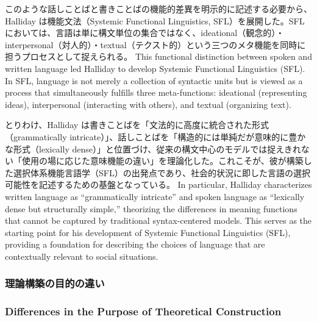 \ifJPN
このような話しことばと書きことばの機能的差異を明示的に記述する必要から、Halliday は機能文法（Systemic Functional Linguistics, SFL）を展開した。SFL においては、言語は単に構文単位の集合ではなく、ideational（観念的）・interpersonal（対人的）・textual（テクスト的）という三つのメタ機能を同時に担うプロセスとして捉えられる。
\else
  This functional distinction between spoken and written language led Halliday to develop Systemic Functional Linguistics (SFL). In SFL, language is not merely a collection of syntactic units but is viewed as a process that simultaneously fulfills three meta-functions: ideational (representing ideas), interpersonal (interacting with others), and textual (organizing text).
\fi

\ifJPN
とりわけ、Halliday は書きことばを「文法的に高度に統合された形式（grammatically intricate）」、話しことばを「構造的には単純だが意味的に豊かな形式（lexically dense）」と位置づけ、従来の構文中心のモデルでは捉えきれない「使用の場に応じた意味機能の違い」を理論化した。これこそが、彼が構築した選択体系機能言語学（SFL）の出発点であり、社会的状況に即した言語の選択可能性を記述するための基盤となっている。
\else
In particular, Halliday characterizes written language as ``grammatically intricate'' and spoken language as ``lexically dense but structurally simple,'' theorizing the differences in meaning functions that cannot be captured by traditional syntax-centered models. This serves as the starting point for his development of Systemic Functional Linguistics (SFL), providing a foundation for describing the choices of language that are contextually relevant to social situations.
\fi

\ifJPN
\subsubsection{理論構築の目的の違い}
\else
\subsubsection{Differences in the Purpose of Theoretical Construction}
\fi

